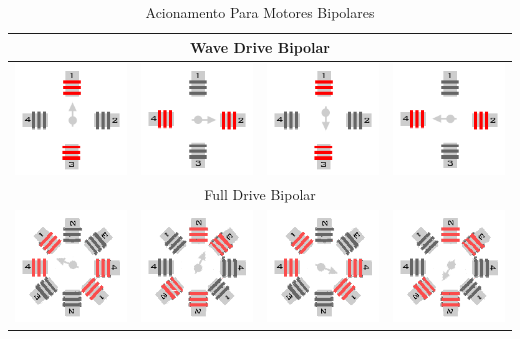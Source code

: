 \begin{table}[H]
	\centering
	\caption{Acionamento Para Motores Bipolares}
	\label{Table:AcionamentoBipolar}
	\begin{tabular}{|cccc|}
		\hline
		\multicolumn{4}{|c|}{Wave Drive Bipolar}  \\
		\hline
		\includegraphics[width = 0.15\columnwidth]{Images/AcionamentoDoHSM/Bipolar/WaveDrive/WaveDriveI.png} & \includegraphics[width = 0.15\columnwidth]{Images/AcionamentoDoHSM/Bipolar/WaveDrive/WaveDriveII.png} & \includegraphics[width = 0.15\columnwidth]{Images/AcionamentoDoHSM/Bipolar/WaveDrive/WaveDriveIII.png} & \includegraphics[width = 0.15\columnwidth]{Images/AcionamentoDoHSM/Bipolar/WaveDrive/WaveDriveIV.png} \\
		\hline
		\multicolumn{4}{|c|}{Full Drive Bipolar}  \\
		\hline
		\includegraphics[width = 0.15\columnwidth]{Images/AcionamentoDoHSM/Bipolar/FullDrive/FullDriveI.png} & \includegraphics[width = 0.15\columnwidth]{Images/AcionamentoDoHSM/Bipolar/FullDrive/FullDriveII.png} & \includegraphics[width = 0.15\columnwidth]{Images/AcionamentoDoHSM/Bipolar/FullDrive/FullDriveIII.png} & \includegraphics[width = 0.15\columnwidth]{Images/AcionamentoDoHSM/Bipolar/FullDrive/FullDriveIV.png} \\

\end{tabular}
\end{table}
